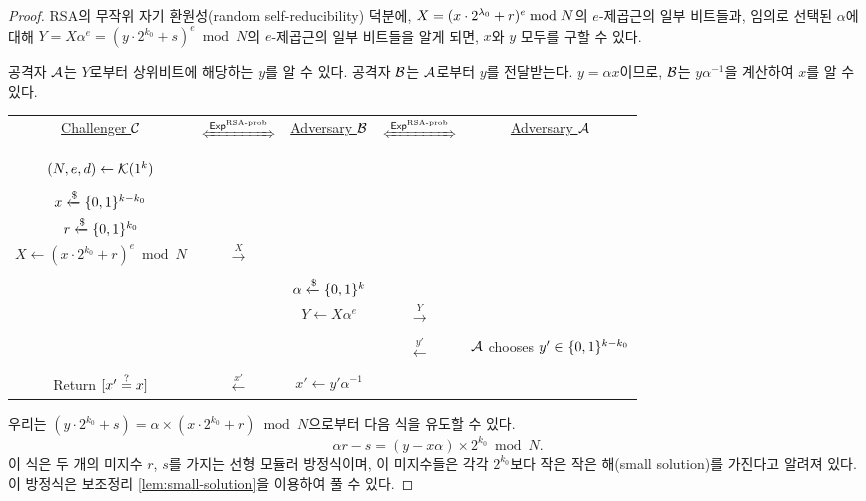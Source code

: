 \begin{proof}
    RSA의 무작위 자기 환원성(random self-reducibility) 덕분에, $X = (x \cdot
    2^{\lambda_0} + r)^e \bmod N$의 $e$-제곱근의 일부 비트들과, 임의로 선택된
    $\alpha$에 대해 $Y = X\alpha^e = (y \cdot 2^{k_0} + s)^e \bmod N$의
    $e$-제곱근의 일부 비트들을 알게 되면, $x$와 $y$ 모두를 구할 수 있다. 

    \begin{memo}
        공격자 $\mathcal{A}$는 $Y$로부터 상위비트에 해당하는 $y$를 알 수 있다. 공격자
        $\mathcal{B}$는 $\mathcal{A}$로부터 $y$를 전달받는다. $y = \alpha x$이므로, $\mathcal{B}$는 $y
        \alpha^{-1}$을 계산하여 $x$를 알 수 있다.
    \end{memo}

    \begin{tcolorbox}[colback=white]
        \centering
        \begin{tabularx}{\linewidth}{CcCcC}
            \underline{Challenger $\mathcal{C}$} & $\xLeftrightarrow{\EXP^{\textnormal{RSA-prob}}}$ & \underline{Adversary $\mathcal{B}$} & $\xLeftrightarrow{\EXP^{\textnormal{RSA-prob}}}$ & \underline{Adversary $\mathcal{A}$} \\
            \\
            $(N, e, d) \gets \mathcal{K}(1^{k})$ & & & & \\
            \\
            $x \xleftarrow{\$} \{0, 1\}^{k - k_0}$ & & & & \\
            $r \xleftarrow{\$} \{0, 1\}^{k_0}$ & & & & \\
            $X \gets (x \cdot 2^{k_0} + r)^e \bmod N$ & $\xrightarrow{X}$ & & & \\
            \\
            & & $\alpha \xleftarrow{\$} \{0, 1\}^{k}$ & & \\
            & & $Y \gets X \alpha^e$ & $\xrightarrow{Y}$ & \\
            \\
            & & & $\xleftarrow{y'}$ & $\mathcal{A}$ chooses $y' \in \{0, 1\}^{k - k_0}$ \\
            \\
            Return $[x' \overset{?}{=} x]$ & $\xleftarrow{x'}$ & $x' \gets y' \alpha^{-1}$ & & \\
      \end{tabularx}
    \end{tcolorbox}

    우리는 $(y \cdot 2^{k_0} + s) = \alpha \times (x \cdot 2^{k_0} + r) \bmod
    N$으로부터 다음 식을 유도할 수 있다.
    $$
        \alpha r - s = (y - x\alpha) \times 2^{k_0} \bmod N.
    $$
    이 식은 두 개의 미지수 $r$, $s$를 가지는 선형 모듈러 방정식이며, 이
    미지수들은 각각 $2^{k_0}$보다 작은 작은 해(small solution)를 가진다고 알려져
    있다. 이 방정식은 보조정리 \ref{lem:small-solution}을 이용하여 풀 수 있다.


\end{proof}
